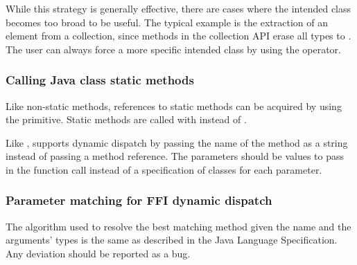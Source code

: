 \documentclass[10pt]{book}
\begin{document}
While this strategy is generally effective, there are cases where the
intended class becomes too broad to be useful. The typical example
is the extraction of an element from a collection, since methods in
the collection API erase all types to . The user can
always force a more specific intended class by using the 
operator.


\subsubsection{Calling Java class static methods}

Like non-static methods, references to static methods can be acquired by
using the  primitive. Static methods are called with
 instead of .

Like ,  supports dynamic dispatch by
passing the name of the method as a string instead of passing a method reference.
The parameters should be values to pass in the function call instead of
a specification of classes for each parameter.

\subsubsection{Parameter matching for FFI dynamic dispatch}
\label{sec:param-matching-for-ffi}

The algorithm used to resolve the best matching method given the name
and the arguments' types is the same as described in the Java Language
Specification. Any deviation should be reported as a bug.
\end{document}
